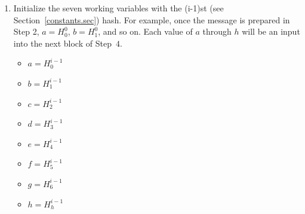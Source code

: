 \documentclass{article}
\begin{document}
\begin{enumerate}
    \item Initialize the seven working variables with the (i-1)st (see Section~\ref{constants.sec})
      hash.  For example, once the message is prepared in Step 2,
      $a = H_0^0$, $b = H_1^0$, and so on.  Each value of $a$ through
      $h$ will be an input into the next block of Step~$4$.  
      \begin{itemize}
      \item $a = H_0^{i-1}$
      \item $b = H_1^{i-1}$
      \item $c = H_2^{i-1}$
      \item $d = H_3^{i-1}$
      \item $e = H_4^{i-1}$
      \item $f = H_5^{i-1}$
      \item $g = H_6^{i-1}$
      \item $h = H_h^{i-1}$        
      \end{itemize}


\end{enumerate}
\end{document}
